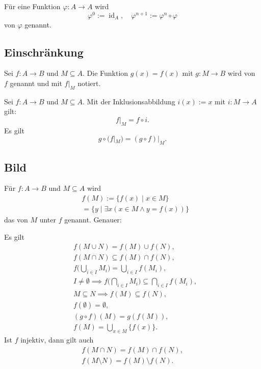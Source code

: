 \begin{definition}[Iteration]\mbox{}\newline
Für eine Funktion $\varphi\colon A\to A$ wird
\begin{equation}
\varphi^0:=\operatorname{id}_A,\quad \varphi^{n+1}:=\varphi^n\circ\varphi
\end{equation}
 von $\varphi$ genannt.
\end{definition}

\subsection{Einschränkung}
\begin{definition}[Einschränkung]\mbox{}\newline
Sei $f\colon A\to B$ und $M\subseteq A$.
Die Funktion $g(x)=f(x)$ mit $g\colon M\to B$ wird 
von $f$ genannt und mit $f|_M$ notiert.
\end{definition}
Sei $f\colon A\to B$ und $M\subseteq A$.
Mit der Inklusionsabbildung $i(x):=x$ mit $i\colon M\to A$ gilt:
\begin{equation}
f|_M = f\circ i.
\end{equation}
Es gilt
\begin{equation}
g\circ (f|_M) = (g\circ f)|_M.
\end{equation}

\newpage
\subsection{Bild}
\begin{definition}[Bild]\mbox{}\newline
Für $f\colon A\to B$ und $M\subseteq A$ wird
\begin{equation}
\begin{split}
&f(M) := \{f(x)\mid x\in M\}\\
& = \{y\mid \exists x(x\in M\land y=f(x))\}
\end{split}
\end{equation}
das  von $M$ unter $f$ genannt. Genauer:
\end{definition}
Es gilt
\begin{align}
&f(M\cup N) = f(M)\cup f(N),\\
&f(M\cap N) \subseteq f(M)\cap f(N),\\
&f\Big(\bigcup_{i\in I}M_i\Big) = \bigcup_{i\in I} f(M_i),\\
&I\ne\emptyset\implies f\Big(\bigcap_{i\in I} M_i\Big) \subseteq \bigcap_{i\in I} f(M_i),\\
&M\subseteq N\implies f(M)\subseteq f(N),\\
&f(\emptyset) = \emptyset,\\
&(g\circ f)(M) = g(f(M)),\\
&f(M) = \bigcup_{x\in M} \{f(x)\}.
\end{align}
Ist $f$ injektiv, dann gilt auch
\begin{gather}
f(M\cap N) = f(M)\cap f(N),\\
f(M\setminus N) = f(M)\setminus f(N).
\end{gather}


